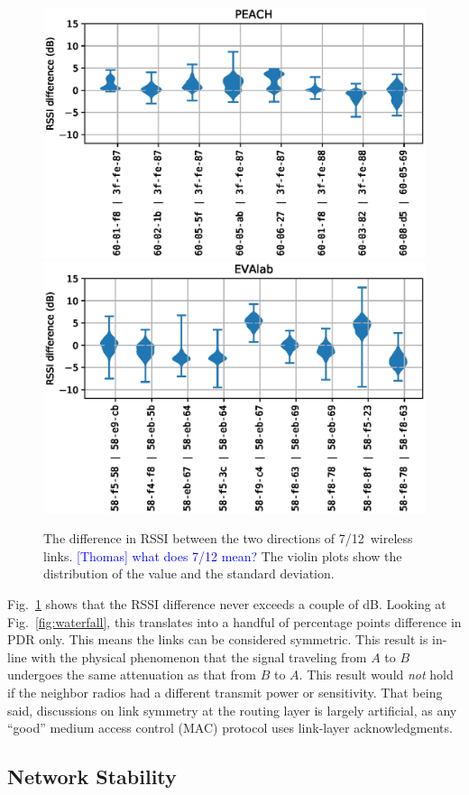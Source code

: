\documentclass{elsarticle}
\newcommand{\thomas}[1]      {\textcolor{blue}{[Thomas] #1}}
\begin{document}
\begin{figure}
    \includegraphics[width=0.5\columnwidth]{asymmetry_peach.eps}
    \includegraphics[width=0.5\columnwidth]{asymmetry.eps}
    \caption{
        The difference in RSSI between the two directions of 7/12~wireless links.
        \thomas{what does 7/12 mean?}
        The violin plots show the distribution of the value and the standard deviation.
    }
    \label{fig:tab_symmetry}
\end{figure}


Fig.~\ref{fig:tab_symmetry} shows that the RSSI difference never exceeds a couple of dB.
Looking at Fig.~\ref{fig:waterfall}, this translates into a handful of percentage points difference in PDR only.
This means the links can be considered symmetric.
This result is in-line with the physical phenomenon that the signal traveling from $A$ to $B$ undergoes the same attenuation as that from $B$ to $A$.
This result would \textit{not} hold if the neighbor radios had a different transmit power or sensitivity.
That being said, discussions on link symmetry at the routing layer is largely artificial, as any ``good'' medium access control (MAC) protocol uses link-layer acknowledgments.

\subsection{Network Stability}
\label{sec:net_stability}

\end{document}
